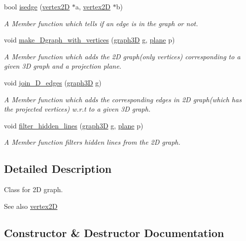 \begin{DoxyCompactItemize}
bool \hyperlink{classgraph2D_a81175519185c21347127968da495ce75}{isedge} (\hyperlink{classvertex2D}{vertex2D} $\ast$a, \hyperlink{classvertex2D}{vertex2D} $\ast$b)
\begin{DoxyCompactList}\small\item\em A Member function which tells if an edge is in the graph or not. \end{DoxyCompactList}\item 
void \hyperlink{classgraph2D_a060f2ba8f4edbd896fafe5d4e7990b86}{make\+\_\+Dgraph\+\_\+with\+\_\+vertices} (\hyperlink{classgraph3D}{graph3D} g, \hyperlink{classplane}{plane} p)
\begin{DoxyCompactList}\small\item\em A Member function which adds the 2D graph(only vertices) corresponding to a given 3D graph and a projection plane. \end{DoxyCompactList}\item 
void \hyperlink{classgraph2D_ae7f6f12a73326f7cbbaa3f87ea59c0ad}{join\+\_\+D\+\_\+edges} (\hyperlink{classgraph3D}{graph3D} g)
\begin{DoxyCompactList}\small\item\em A Member function which adds the corresponding edges in 2D graph(which has the projected vertices) w.\+r.\+t to a given 3D graph. \end{DoxyCompactList}\item 
void \hyperlink{classgraph2D_a713850a586c412115558b9c34e0bef5a}{filter\+\_\+hidden\+\_\+lines} (\hyperlink{classgraph3D}{graph3D} g, \hyperlink{classplane}{plane} p)
\begin{DoxyCompactList}\small\item\em A Member function filters hidden lines from the 2D graph. \end{DoxyCompactList}\end{DoxyCompactItemize}


\subsection{Detailed Description}
Class for 2D graph. 

\begin{DoxySeeAlso}{See also}
\hyperlink{classvertex2D}{vertex2D} 
\end{DoxySeeAlso}


\subsection{Constructor \& Destructor Documentation}
